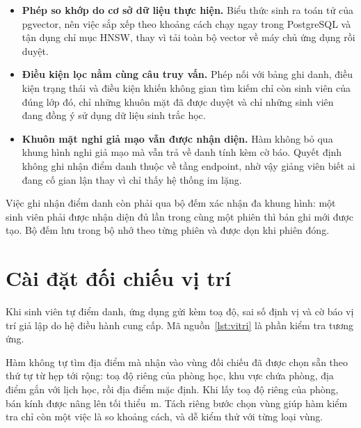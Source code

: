 \begin{itemize}[leftmargin=1.6em, itemsep=3pt]
  \item \textbf{Phép so khớp do cơ sở dữ liệu thực hiện.} Biểu thức
         sinh ra toán tử của pgvector, nên việc sắp
        xếp theo khoảng cách chạy ngay trong PostgreSQL và tận dụng chỉ mục
        HNSW, thay vì tải toàn bộ vector về máy chủ ứng dụng rồi duyệt.
  \item \textbf{Điều kiện lọc nằm cùng câu truy vấn.} Phép nối với bảng ghi
        danh, điều kiện trạng thái  và điều kiện
         khiến không gian tìm kiếm chỉ còn sinh viên của
        đúng lớp đó, chỉ những khuôn mặt đã được duyệt và chỉ những sinh viên
        đang đồng ý sử dụng dữ liệu sinh trắc học.
  \item \textbf{Khuôn mặt nghi giả mạo vẫn được nhận diện.} Hàm không bỏ qua
        khung hình nghi giả mạo mà vẫn trả về danh tính kèm cờ báo. Quyết
        định không ghi nhận điểm danh thuộc về tầng endpoint, nhờ vậy giảng
        viên biết ai đang cố gian lận thay vì chỉ thấy hệ thống im lặng.
\end{itemize}

Việc ghi nhận điểm danh còn phải qua bộ đếm xác nhận đa khung hình: một sinh
viên phải được nhận diện đủ \FsoKhungXacNhan{} lần trong cùng một phiên thì
bản ghi mới được tạo. Bộ đếm lưu trong bộ nhớ theo từng phiên và được dọn khi
phiên đóng.

\section{Cài đặt đối chiếu vị trí}

Khi sinh viên tự điểm danh, ứng dụng gửi kèm toạ độ, sai số định vị và cờ báo
vị trí giả lập do hệ điều hành cung cấp. Mã nguồn~\ref{lst:vitri} là phần
kiểm tra tương ứng.



Hàm không tự tìm địa điểm mà nhận vào vùng đối chiếu  đã được
chọn sẵn theo thứ tự từ hẹp tới rộng: toạ độ riêng của phòng học, khu vực
chứa phòng, địa điểm gắn với lịch học, rồi địa điểm mặc định. Khi lấy toạ độ
riêng của phòng, bán kính được nâng lên tối thiểu \FbanKinhPhong\,m. Tách
riêng bước chọn vùng giúp hàm kiểm tra chỉ còn một việc là so khoảng cách,
và dễ kiểm thử với từng loại vùng.

